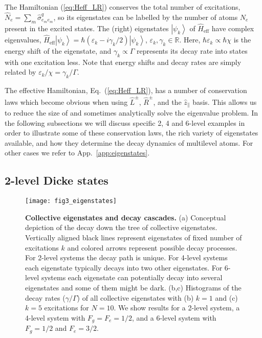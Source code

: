 \documentclass[aps,prx,superscriptaddress,twocolumn,notitlepage,nofootinbib,longbibliography]{revtex4-2}
\newcommand{\ket}[1]{\left|#1\right>}
\newcommand{\quv}{\hat{z}}
\newcommand{\qusub}{q}
\begin{document}
The Hamiltonian (\ref{eq:Heff_LR}) conserves the total number of excitations, $\hat{N}_e = \sum_m \hat{\sigma}^{\qusub}_{e_me_m}$, so its eigenstates can be labelled by the number of atoms $N_e$ present in the excited states.
The (right) eigenstates $\ket{\psi_k}$ of $\hat{H}_\text{eff}$ have complex eigenvalues, $\hat{H}_\text{eff} \ket{\psi_k} =\hbar (\varepsilon_k - i \gamma_k /2) \ket{\psi_k}$, $\varepsilon_k,\gamma_k\in \mathbb{R}$. Here, $\hbar \varepsilon_k \propto \hbar \chi$ is the energy shift of the eigenstate, and  $\gamma_k \propto \Gamma$ represents its decay rate into states with one excitation less. Note that energy shifts and decay rates are simply related by $\varepsilon_k/\chi = \gamma_k/\Gamma$.

The effective Hamiltonian, Eq.~(\ref{eq:Heff_LR}), has a number of conservation laws which become obvious when using $\hat{L}^\pm$, $\hat{R}^\pm$, and the $\quv_\parallel$ basis. This allows us to reduce the size of and sometimes analytically solve the eigenvalue problem.
In the following subsections we will discuss specific 2, 4 and 6-level examples in order to illustrate some of these conservation laws, the rich variety of  eigenstates available, and how they  determine  the decay dynamics of multilevel atoms.
For other cases we refer to App.~\ref{app:eigenstates}.












\subsection{2-level Dicke states\label{eq:eigenstates_2l}}

\begin{figure}[!t]
\centering
\texttt{[image: fig3\_eigenstates]}
\caption{\textbf{Collective eigenstates and decay cascades.} (a) Conceptual depiction of the decay down the tree of collective eigenstates. Vertically aligned black lines represent eigenstates of fixed number of excitations $k$ and colored arrows represent possible decay processes. For 2-level systems the decay path is unique. For 4-level systems each eigenstate typically decays into two other eigenstates. For 6-level systems each eigenstate can potentially decay into several eigenstates and some of them might be dark. (b,c) Histograms of the decay rates ($\gamma/\Gamma$) of all collective eigenstates with (b) $k=1$ and (c) $k=5$ excitations for $N=10$. We show results for a 2-level system, a 4-level system with $F_g=F_e=1/2$, and a 6-level system with $F_g=1/2$ and $F_e=3/2$.}
\label{fig:eigenstates}
\end{figure}
\end{document}
